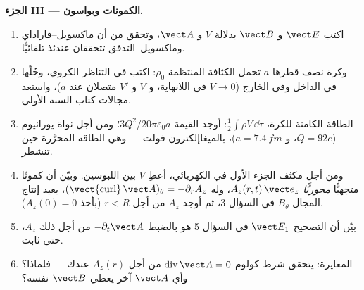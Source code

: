 \begin{problem}
\medskip
\noindent\textbf{الجزء III --- الكمونات وبواسون.}
\begin{enumerate}[resume]
  \item اكتب $\vect E$ و $\vect B$ بدلالة $V$ و $\vect A$، وتحقق
        من أن ماكسويل--فاراداي وماكسويل--التدفق تتحققان عندئذ
        تلقائيًّا.
  \item وكرة نصف قطرها $a$ تحمل الكثافة المنتظمة $\rho_0$: اكتب
         في التناظر الكروي، وحُلّها في الداخل وفي
        الخارج ($V \to 0$ في اللانهاية، و $V$ و $V'$ متصلان عند $a$)،
        واستعد مجالات كتاب السنة الأولى.
  \item الطاقة الكامنة للكرة، $\tfrac12\int\rho V\,\dd\tau$: أوجد القيمة
        $3Q^2/20\pi\varepsilon_0a$؛ ومن أجل نواة يورانيوم ($Q = 92e$، و $a =
        \qty{7.4}{fm}$)، بالميغاإلكترون فولت --- وهي الطاقة المحرَّرة حين تنشطر.
  \item ومن أجل مكثف الجزء الأول في 
        الكهربائي، أعطِ $V$ بين اللبوسين. وبيّن أن كمونًا متجهيًّا
        \emph{محوريًّا} $A_z(r, t)\,\vect e_z$، وله $(\operatorname{\vect{curl}}
        \vect A)_\theta = -\partial_rA_z$، يعيد إنتاج المجال $B_\theta$ في
        السؤال 3، ثم أوجد $A_z$ من أجل $r < R$ (بأخذ $A_z(0) = 0$).
  \item بيّن أن التصحيح $\vect E_1$ في السؤال 5 هو بالضبط
        $-\partial_t\vect A$ من أجل ذلك $A_z$، حتى ثابت.
  \item المعايرة: يتحقق شرط كولوم $\operatorname{div}\vect A = 0$ من أجل
        $A_z(r)$ عندك --- فلماذا؟ وأي $\vect A$ آخر يعطي $\vect B$ نفسه؟
\end{enumerate}


\end{problem}
